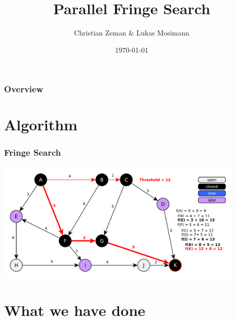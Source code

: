 \documentclass{beamer}
\title[Parallel Fringe Search]{Parallel Fringe Search} %
\author{Christian Zeman \& Lukas Mosimann} %
\institute[ETH] %
{
ETH Zürich \\ %
\medskip
\textit{Design of Parallel and High-Performance Computing} %
}
\date{\today} %
\begin{document}
\begin{frame}
\titlepage %
\end{frame}

\begin{frame}
\frametitle{Overview} %
\tableofcontents %
\end{frame}


\section{Algorithm} %

\begin{frame}
\frametitle{Fringe Search}
\includegraphics[height=165pt]{fringe7.pdf}
\end{frame}

\section{What we have done}
\end{document}
